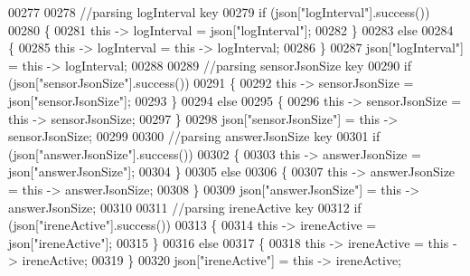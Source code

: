 \begin{DoxyCode}
00277 
00278             \textcolor{comment}{//parsing logInterval key}
00279             \textcolor{keywordflow}{if} (json[\textcolor{stringliteral}{"logInterval"}].success())
00280             \{
00281                 \textcolor{keyword}{this} -> logInterval = json[\textcolor{stringliteral}{"logInterval"}];
00282             \}
00283             \textcolor{keywordflow}{else}
00284             \{
00285                 \textcolor{keyword}{this} -> logInterval = \textcolor{keyword}{this} -> logInterval;
00286             \}
00287             json[\textcolor{stringliteral}{"logInterval"}] = \textcolor{keyword}{this} -> logInterval;
00288 
00289             \textcolor{comment}{//parsing sensorJsonSize key}
00290             \textcolor{keywordflow}{if} (json[\textcolor{stringliteral}{"sensorJsonSize"}].success())
00291             \{
00292                 \textcolor{keyword}{this} -> sensorJsonSize = json[\textcolor{stringliteral}{"sensorJsonSize"}];
00293             \}
00294             \textcolor{keywordflow}{else}
00295             \{
00296                 \textcolor{keyword}{this} -> sensorJsonSize = \textcolor{keyword}{this} -> sensorJsonSize;
00297             \}
00298             json[\textcolor{stringliteral}{"sensorJsonSize"}] = \textcolor{keyword}{this} -> sensorJsonSize;
00299             
00300             \textcolor{comment}{//parsing answerJsonSize key            }
00301             \textcolor{keywordflow}{if} (json[\textcolor{stringliteral}{"answerJsonSize"}].success())
00302             \{
00303                 \textcolor{keyword}{this} -> answerJsonSize = json[\textcolor{stringliteral}{"answerJsonSize"}];
00304             \}
00305             \textcolor{keywordflow}{else}
00306             \{
00307                 \textcolor{keyword}{this} -> answerJsonSize = \textcolor{keyword}{this} -> answerJsonSize;
00308             \}
00309             json[\textcolor{stringliteral}{"answerJsonSize"}] = \textcolor{keyword}{this} -> answerJsonSize;
00310             
00311             \textcolor{comment}{//parsing ireneActive key           }
00312             \textcolor{keywordflow}{if} (json[\textcolor{stringliteral}{"ireneActive"}].success())
00313             \{
00314                 \textcolor{keyword}{this} -> ireneActive = json[\textcolor{stringliteral}{"ireneActive"}];
00315             \}
00316             \textcolor{keywordflow}{else}
00317             \{
00318                 \textcolor{keyword}{this} -> ireneActive = \textcolor{keyword}{this} -> ireneActive;
00319             \}
00320             json[\textcolor{stringliteral}{"ireneActive"}] = \textcolor{keyword}{this} -> ireneActive;

\end{DoxyCode}
